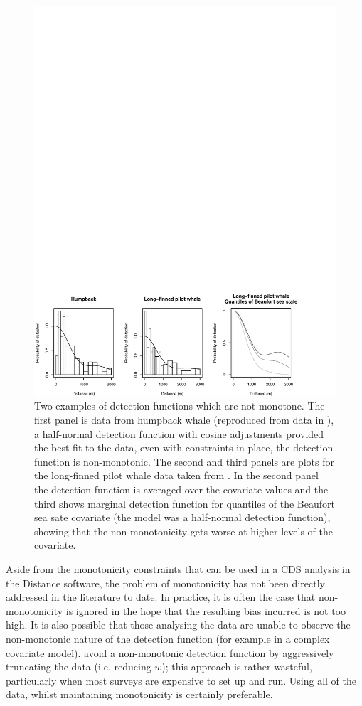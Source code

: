 \begin{figure}
\centering
\includegraphics[width=\textwidth]{mix/figs/figure1.pdf}
\caption{Two examples of detection functions which are not monotone. The first panel is data from humpback whale (reproduced from data in ), a half-normal detection function with cosine adjustments provided the best fit to the data, even with constraints in place, the detection function is non-monotonic. The second and third panels are plots for the long-finned pilot whale data taken from \cite{pike}. In the second panel the detection function is averaged over the covariate values and the third shows marginal detection function for quantiles of the Beaufort sea sate covariate (the model was a half-normal detection function), showing that the non-monotonicity gets worse at higher levels of the covariate.}
\label{fig1}
\end{figure}

\label{cor-7s14}Aside from the monotonicity constraints that can be used in a CDS analysis in the Distance software, the problem of monotonicity has not been directly addressed in the literature to date. In practice, it is often the case that non-monotonicity is ignored in the hope that the resulting bias incurred is not too high. It is also possible that those analysing the data are unable to observe the non-monotonic nature of the detection function (for example in a complex covariate model).  avoid a non-monotonic detection function by aggressively truncating the data (i.e. reducing $w$); this approach is rather wasteful, particularly when most surveys are expensive to set up and run. Using all of the data, whilst maintaining monotonicity is certainly preferable.

